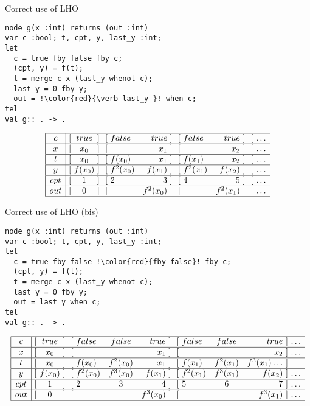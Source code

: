 \documentclass[xcolor=dvipsnames]{beamer}
\def\li{\\ \hline}
\begin{document}
\begin{frame}[fragile]{Correct use of LHO}
\begin{lstlisting}[escapechar=!]
node g(x :int) returns (out :int)
var c :bool; t, cpt, y, last_y :int;
let
  c = true fby false fby c;
  (cpt, y) = f(t);
  t = merge c x (last_y whenot c);
  last_y = 0 fby y;
  out = !\color{red}{\verb-last_y-}! when c;
tel
val g:: . -> .
\end{lstlisting}
\[
\begin{array}{|c|@{\ [\ }c@{\ ]\ }@{\ [\ }lr@{\ ]\ }@{\ [\ }lr@{\ ]\ }@{\ [\ }lr} \hline
c & true & false & true & false & true & \ldots\li
x & x_0 & & x_1 & & x_2 &\ldots\li
t & x_0 & f(x_0) & x_1 & f(x_1) & x_2 &\ldots\li
y & f(x_0) & f^2(x_0) & f(x_1) & f^2(x_1) & f(x_2) &\ldots\li
cpt & 1 & 2 & 3 & 4 & 5 &\ldots\li
out & 0 & & f^2(x_0) & & f^2(x_1) &\ldots \li
\end{array}
\]
\end{frame}

\begin{frame}[fragile]{Correct use of LHO (bis)}
\begin{lstlisting}[escapechar=!]
node g(x :int) returns (out :int)
var c :bool; t, cpt, y, last_y :int;
let
  c = true fby false !\color{red}{fby false}! fby c;
  (cpt, y) = f(t);
  t = merge c x (last_y whenot c);
  last_y = 0 fby y;
  out = last_y when c;
tel
val g:: . -> .
\end{lstlisting}
\[
\begin{array}{|c|@{\ [\ }c@{\ ]\ }@{\ [\ }lcr@{\ ]\ }@{\ [\ }lcr@{\ ]\ }l} \hline
c & true & false & false & true & false & false & true & \ldots\li
x & x_0 & & & x_1 & & & x_2 &\ldots\li
t & x_0 & f(x_0) & f^2(x_0) & x_1 & f(x_1) & f^2(x_1) & f^3(x_1)\ldots\li
y & f(x_0) & f^2(x_0) & f^3(x_0) & f(x_1) & f^2(x_1) & f^3(x_1) & f(x_2) &\ldots\li
cpt & 1 & 2 & 3 & 4 & 5 & 6 & 7 &\ldots\li
out & 0 & & & f^3(x_0) & & & f^3(x_1) &\ldots \li
\end{array}
\]
\end{frame}
\end{document}
